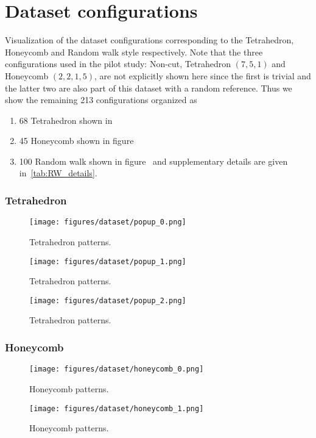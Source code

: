 \chapter{Dataset configurations}\label{sec:dataset_conf}
Visualization of the dataset configurations corresponding to the Tetrahedron, Honeycomb and Random walk style respectively. Note that the three configurations used in the pilot study: Non-cut, Tetrahedron $(7,5,1)$ and Honeycomb $(2,2,1,5)$, are not explicitly shown here since the first is trivial and the latter two are also part of this dataset with a random reference. Thus we show the remaining 213 configurations organized as
\begin{enumerate}
    \item 68 Tetrahedron shown in~
    \item 45 Honeycomb shown in figure~
    \item 100 Random walk shown in figure~ and supplementary details are given in~\cref{tab:RW_details}.
\end{enumerate}
\newpage

\subsection{Tetrahedron}
\begin{figure}[H]
    \centering
    \texttt{[image: figures/dataset/popup\_0.png]}
    \caption{Tetrahedron patterns.}
    \label{fig:T0}
\end{figure}
\begin{figure}[H]
    \centering
    \texttt{[image: figures/dataset/popup\_1.png]}
    \caption{Tetrahedron patterns.}
    \label{fig:T1}
\end{figure}
\begin{figure}[H]
    \centering
    \texttt{[image: figures/dataset/popup\_2.png]}
    \caption{Tetrahedron patterns.}
    \label{fig:T2}
\end{figure}


\subsection{Honeycomb}
\begin{figure}[H]
    \centering
    \texttt{[image: figures/dataset/honeycomb\_0.png]}
    \caption{Honeycomb patterns.}
    \label{fig:H0}
\end{figure}
\begin{figure}[H]
    \centering
    \texttt{[image: figures/dataset/honeycomb\_1.png]}
    \caption{Honeycomb patterns.}
    \label{fig:H1}
\end{figure}

